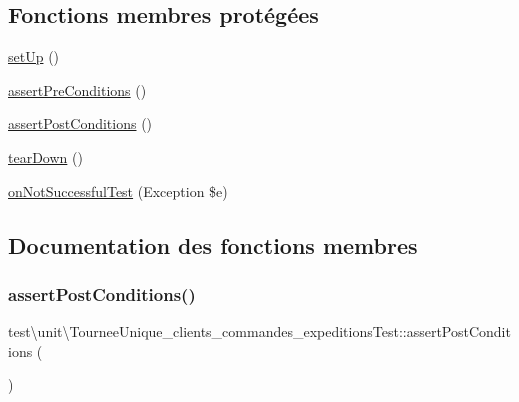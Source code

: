\subsection*{Fonctions membres protégées}
\begin{DoxyCompactItemize}
\item 
\hyperlink{classtest_1_1unit_1_1TourneeUnique__clients__commandes__expeditionsTest_a719e79807a6f950249a1a652d1fdd9bc}{set\+Up} ()
\item 
\hyperlink{classtest_1_1unit_1_1TourneeUnique__clients__commandes__expeditionsTest_ac26b07915464c874f1991b9300922ec6}{assert\+Pre\+Conditions} ()
\item 
\hyperlink{classtest_1_1unit_1_1TourneeUnique__clients__commandes__expeditionsTest_aa68d89b21702013783e4a57add0c409c}{assert\+Post\+Conditions} ()
\item 
\hyperlink{classtest_1_1unit_1_1TourneeUnique__clients__commandes__expeditionsTest_a9e70f3779c673a7fbb267fe4ca29917c}{tear\+Down} ()
\item 
\hyperlink{classtest_1_1unit_1_1TourneeUnique__clients__commandes__expeditionsTest_a2f9ee63f494887549194cbfb8402b238}{on\+Not\+Successful\+Test} (Exception \$e)
\end{DoxyCompactItemize}


\subsection{Documentation des fonctions membres}
\mbox{\label{classtest_1_1unit_1_1TourneeUnique__clients__commandes__expeditionsTest_aa68d89b21702013783e4a57add0c409c}} 
\subsubsection{\texorpdfstring{assert\+Post\+Conditions()}{assertPostConditions()}}
{\footnotesize\ttfamily test\textbackslash{}unit\textbackslash{}\+Tournee\+Unique\+\_\+clients\+\_\+commandes\+\_\+expeditions\+Test\+::assert\+Post\+Conditions (\begin{DoxyParamCaption}{ }\end{DoxyParamCaption})\hspace{0.3cm}{\ttfamily [protected]}}

